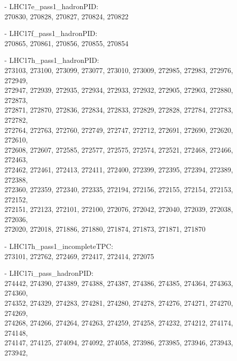 \begin{appendix}
\vspace{\columnsep}
\begin{itemize}
    \small
    \item[] 
    \footnotesize
    \item[-] LHC17e\_pass1\_hadronPID:\\[1pt]
     270830, 270828, 270827, 270824, 270822
    \item[-] LHC17f\_pass1\_hadronPID:\\[1pt]
     270865, 270861, 270856, 270855, 270854
    \item[-] LHC17h\_pass1\_hadronPID:\\[1pt]
     273103, 273100, 273099, 273077, 273010, 273009, 272985, 272983, 272976, 272949,\\
     272947, 272939, 272935, 272934, 272933, 272932, 272905, 272903, 272880, 272873,\\
     272871, 272870, 272836, 272834, 272833, 272829, 272828, 272784, 272783, 272782,\\
     272764, 272763, 272760, 272749, 272747, 272712, 272691, 272690, 272620, 272610,\\
     272608, 272607, 272585, 272577, 272575, 272574, 272521, 272468, 272466, 272463,\\
     272462, 272461, 272413, 272411, 272400, 272399, 272395, 272394, 272389, 272388,\\
     272360, 272359, 272340, 272335, 272194, 272156, 272155, 272154, 272153, 272152,\\
     272151, 272123, 272101, 272100, 272076, 272042, 272040, 272039, 272038, 272036,\\
     272020, 272018, 271886, 271880, 271874, 271873, 271871, 271870
    \item[-] LHC17h\_pass1\_incompleteTPC:\\[1pt]
     273101, 272762, 272469, 272417, 272414, 272075 
    \item[-] LHC17i\_pass\_hadronPID:\\[1pt]
     274442, 274390, 274389, 274388, 274387, 274386, 274385, 274364, 274363, 274360,\\
     274352, 274329, 274283, 274281, 274280, 274278, 274276, 274271, 274270, 274269,\\
     274268, 274266, 274264, 274263, 274259, 274258, 274232, 274212, 274174, 274148,\\
     274147, 274125, 274094, 274092, 274058, 273986, 273985, 273946, 273943, 273942,\\

\end{itemize}
\end{appendix}
